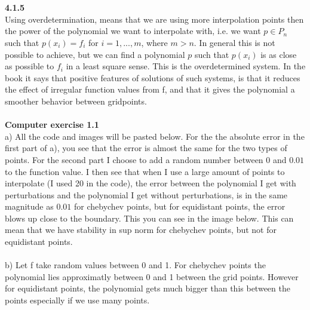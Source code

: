 \documentclass[11pt,a4paper]{report}
\begin{document}
\\
\\
\textbf{4.1.5}
\\
Using overdetermination, means that we are using more interpolation points then the power of the polynomial we want to interpolate with, i.e. we want $p \in P_n$ such that $p(x_i)=f_i$ for $i=1,...,m$, where $m>n$. In general this is not possible to achieve, but we can find a polynomial $p$ such that $p(x_i)$ is as close as possible to $f_i$ in a least square sense. This is the overdetermined system. In the book it says that positive features of solutions of such systems, is that it reduces the effect of irregular function values from f, and that it gives the polynomial a smoother behavior between gridpoints.
\\
\\   
\textbf{Computer exercise 1.1}
\\
a) All the code and images will be pasted below. For the the absolute error in the first part of a), you see that the error is almost the same for the two types of points. For the second part I choose to add a random number between 0 and $0.01$ to the function value. I then see that when I use a large amount of points to interpolate (I used 20 in the code), the error between the polynomial I get with perturbations and the polynomial I get without perturbations, is in the same magnitude as $0.01$ for chebychev points, but for equidistant points, the error blows up close to the boundary. This you can see in the image below. This can mean that we have stability in sup norm for chebychev points, but not for equidistant points.
\\   
\\
b) Let f take random values between 0 and 1. For chebychev points the polynomial lies approximatly between 0 and 1 between the grid points. However for equidistant points, the polynomial gets much bigger than this between the points especially if we use many points. 



\end{document}
